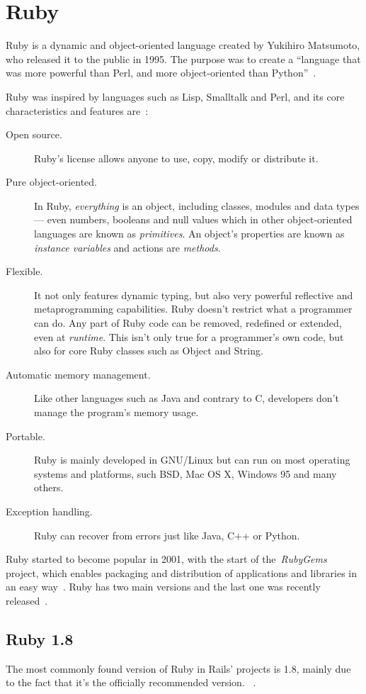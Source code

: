 \section{Ruby} %
\label{tech:sec:ruby}
Ruby is a dynamic and object-oriented language created by Yukihiro Matsumoto, who released it to the public in 1995. The purpose was to create a ``language that was more powerful than Perl, and more object-oriented than Python''~\cite{interview_creator_ruby}.

Ruby was inspired by languages such as Lisp, Smalltalk and Perl, and its core characteristics and features are~\cite{ruby_about, ruby_book}:
\begin{description}
  \item[Open source.] Ruby's license allows anyone to use, copy, modify or distribute it.
  \item[Pure object-oriented.] In Ruby, \emph{everything} is an object, including classes, modules and data types --- even numbers, booleans and null values which in other object-oriented languages are known as \emph{primitives}. An object's properties are known as \emph{instance variables} and actions are \emph{methods}.
  \item[Flexible.] It not only features dynamic typing, but also very powerful reflective and metaprogramming capabilities. Ruby doesn't restrict what a programmer can do. Any part of Ruby code can be removed, redefined or extended, even at \emph{runtime}. This isn't only true for a programmer's own code, but also for core Ruby classes such as Object and String.
 \item[Automatic memory management.] Like other languages such as Java and contrary to C, developers don't manage the program's memory usage.
  \item[Portable.] Ruby is mainly developed in GNU/Linux but can run on most operating systems and platforms, such BSD, Mac OS X, Windows 95 and many others.
  \item[Exception handling.] Ruby can recover from errors just like Java, C++ or Python.
\end{description}
Ruby started to become popular in 2001, with the start of the~\textit{RubyGems} project, which enables packaging and distribution of applications and libraries in an easy way~\cite{ railssolutions}. Ruby has two main versions and the last one was recently released~\cite{ ruby191_release}.


\subsection{Ruby 1.8}
The most commonly found version of Ruby in Rails' projects is 1.8, mainly due to the fact that it's the officially recommended version. ~\cite{rubyonrails_download}.

